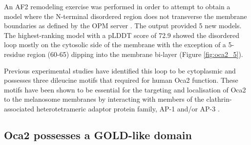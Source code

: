 An AF2 remodeling exercise was performed in order to attempt to obtain a model where the N-terminal disordered region does not transverse the membrane boundaries as defined by the OPM server \cite{Lomize2012}.   The output provided 5 new models. The highest-ranking model with a pLDDT score of 72.9 showed the disordered loop mostly on the cytosolic side of the membrane with the exception of a 5-residue region (60-65) dipping into the membrane bi-layer (Figure \ref{fig:oca2_5}).

Previous experimental studies have identified this loop to be cytoplasmic and possesses three dileucine motifs that required for human Oca2 function. These motifs
have been shown to be essential for the targeting and localisation of Oca2 to the melanosome membranes by interacting with members of the clathrin-associated heterotetrameric adaptor protein family, AP-1 and/or AP-3 \cite{sitaram2009localization}.

\subsection{Oca2 possesses a GOLD-like domain}

